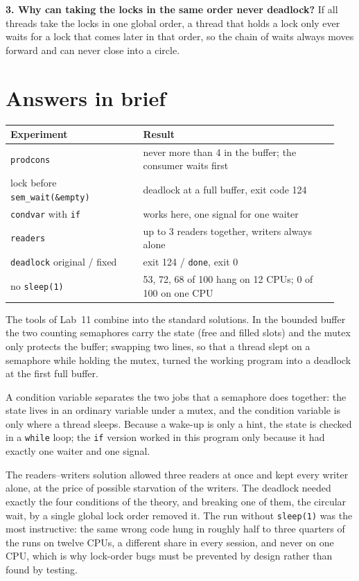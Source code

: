 \documentclass{assets/utmreport}
\begin{document}
\textbf{3. Why can taking the locks in the same order never deadlock?}
If all threads take the locks in one global order, a thread that holds a lock only ever waits for a lock that comes later in that order, so the chain of waits always moves forward and can never close into a circle.

\section*{Answers in brief}
\begin{tabular}{@{}p{0.38\linewidth}p{0.56\linewidth}@{}}
\toprule
Experiment & Result \\
\midrule
\texttt{prodcons} & never more than 4 in the buffer; the consumer waits first \\
lock before \texttt{sem\_wait(\&empty)} & deadlock at a full buffer, exit code 124 \\
\texttt{condvar} with \texttt{if} & works here, one signal for one waiter \\
\texttt{readers} & up to 3 readers together, writers always alone \\
\texttt{deadlock} original / fixed & exit 124 / \texttt{done}, exit 0 \\
no \texttt{sleep(1)} & 53, 72, 68 of 100 hang on 12 CPUs; 0 of 100 on one CPU \\
\bottomrule
\end{tabular}

\utmconclusions
The tools of Lab~11 combine into the standard solutions. In the bounded buffer the two counting semaphores carry the state (free and filled slots) and the mutex only protects the buffer; swapping two lines, so that a thread slept on a semaphore while holding the mutex, turned the working program into a deadlock at the first full buffer.

A condition variable separates the two jobs that a semaphore does together: the state lives in an ordinary variable under a mutex, and the condition variable is only where a thread sleeps. Because a wake-up is only a hint, the state is checked in a \texttt{while} loop; the \texttt{if} version worked in this program only because it had exactly one waiter and one signal.

The readers--writers solution allowed three readers at once and kept every writer alone, at the price of possible starvation of the writers. The deadlock needed exactly the four conditions of the theory, and breaking one of them, the circular wait, by a single global lock order removed it. The run without \texttt{sleep(1)} was the most instructive: the same wrong code hung in roughly half to three quarters of the runs on twelve CPUs, a different share in every session, and never on one CPU, which is why lock-order bugs must be prevented by design rather than found by testing.
\end{document}

